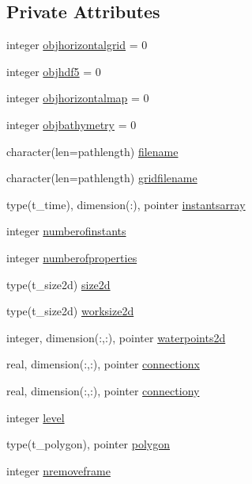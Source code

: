 \subsection*{Private Attributes}
\begin{DoxyCompactItemize}
\item 
integer \mbox{\hyperlink{structmodulepatchhdf5files_1_1t__grid_a2b1a096f49a5ee8e1fea98a699448934}{objhorizontalgrid}} = 0
\item 
integer \mbox{\hyperlink{structmodulepatchhdf5files_1_1t__grid_a3e7cd6f6f192c88aa082b2c3f15fc172}{objhdf5}} = 0
\item 
integer \mbox{\hyperlink{structmodulepatchhdf5files_1_1t__grid_a75c1a0bf7c15f89504b4ac868f062a4f}{objhorizontalmap}} = 0
\item 
integer \mbox{\hyperlink{structmodulepatchhdf5files_1_1t__grid_a7fb3c3c8e9d105b9464cbac6f09b0360}{objbathymetry}} = 0
\item 
character(len=pathlength) \mbox{\hyperlink{structmodulepatchhdf5files_1_1t__grid_ac9be229b722747c3294e70105fa257d8}{filename}}
\item 
character(len=pathlength) \mbox{\hyperlink{structmodulepatchhdf5files_1_1t__grid_a1254db57a4666b10a249cb5b5cce4834}{gridfilename}}
\item 
type(t\+\_\+time), dimension(\+:), pointer \mbox{\hyperlink{structmodulepatchhdf5files_1_1t__grid_ace82a526adeb8b819363d46449bab331}{instantsarray}}
\item 
integer \mbox{\hyperlink{structmodulepatchhdf5files_1_1t__grid_a8b63b60308933933431d18ec0a4dcb1e}{numberofinstants}}
\item 
integer \mbox{\hyperlink{structmodulepatchhdf5files_1_1t__grid_a6ae254d5e2d590281de82a83aef51a48}{numberofproperties}}
\item 
type(t\+\_\+size2d) \mbox{\hyperlink{structmodulepatchhdf5files_1_1t__grid_aafa628dd660567ee422a88c7fb966091}{size2d}}
\item 
type(t\+\_\+size2d) \mbox{\hyperlink{structmodulepatchhdf5files_1_1t__grid_a292826e06b8e119fcc5cb1b7b6088258}{worksize2d}}
\item 
integer, dimension(\+:,\+:), pointer \mbox{\hyperlink{structmodulepatchhdf5files_1_1t__grid_a97c518055da1e63f8c1169b96d60d774}{waterpoints2d}}
\item 
real, dimension(\+:,\+:), pointer \mbox{\hyperlink{structmodulepatchhdf5files_1_1t__grid_a403f6d1ac4e8dd7b37d83177a8ebd4a6}{connectionx}}
\item 
real, dimension(\+:,\+:), pointer \mbox{\hyperlink{structmodulepatchhdf5files_1_1t__grid_ad76f5b304e1ba70ed02d1e475569e733}{connectiony}}
\item 
integer \mbox{\hyperlink{structmodulepatchhdf5files_1_1t__grid_acef7184c52d3cab11ab0d00e28012364}{level}}
\item 
type(t\+\_\+polygon), pointer \mbox{\hyperlink{structmodulepatchhdf5files_1_1t__grid_a6091d9113ccdf157b41e598badd07463}{polygon}}
\item 
integer \mbox{\hyperlink{structmodulepatchhdf5files_1_1t__grid_ab0a5ceead7aec954bc8875b46ab684c3}{nremoveframe}}
\end{DoxyCompactItemize}



